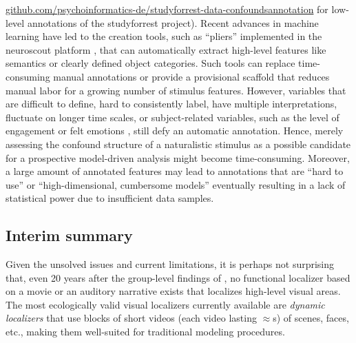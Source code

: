\href{https://github.com/psychoinformatics-de/studyforrest-data-confoundsannotation
}{\url{github.com/psychoinformatics-de/studyforrest-data-confoundsannotation}}
for low-level annotations of the studyforrest project).
%
Recent advances in machine learning have led to the creation tools, such as
``pliers'' \citep{mcnamara2017developing} implemented in the neuroscout platform
\citep[\href{https://neuroscout.org/}{\url{neuroscout.org}};][]{delavega2022neuroscout},
that can automatically extract high-level features like semantics or clearly
defined object categories.
%
Such tools can replace time-consuming manual annotations or provide a
provisional scaffold that reduces manual labor for a growing number of stimulus
features.
%
However, variables that are difficult to define, hard to consistently label,
have multiple interpretations, fluctuate on longer time scales, or
subject-related variables, such as the level of engagement or felt emotions
\citep[cf.][]{lettieri2019emotionotopy, saarimaki2021naturalistic}, still defy
an automatic annotation.
%
Hence, merely assessing the confound structure of a naturalistic stimulus as a
possible candidate for a prospective model-driven analysis might become
time-consuming.
%
Moreover, a large amount of annotated features may lead to annotations that are
``hard to use'' \citep[][p. 2]{richard2019fast} or ``high-dimensional,
cumbersome models'' \citep[][p. 2]{richard2019fast} eventually resulting in a
lack of statistical power due to insufficient data samples.



\subsection{Interim summary}
%
Given the unsolved issues and current limitations, it is perhaps not surprising
that, even 20 years after the group-level findings of
\citet{bartels2004mapping}, no functional localizer based on a movie or an
auditory narrative exists that localizes high-level visual areas.
%
The most ecologically valid visual localizers currently available are
\textit{dynamic localizers} \citep[e.g.,][]{pitcher2011differential,
fox2009defining} that use blocks of short videos (each video lasting
$\approx$\unit[2-3]{s}) of scenes, faces, etc., making them well-suited for
traditional modeling procedures.

